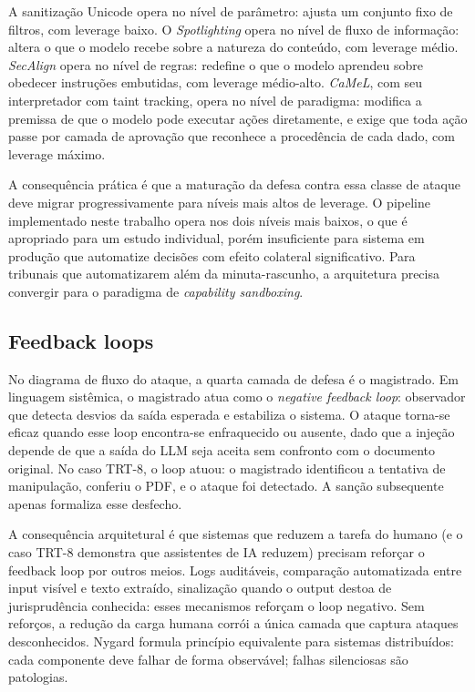 \documentclass[11pt,a4paper]{article}
\begin{document}
A sanitização Unicode opera no nível de parâmetro: ajusta um conjunto fixo de filtros, com leverage baixo. O \emph{Spotlighting} opera no nível de fluxo de informação: altera o que o modelo recebe sobre a natureza do conteúdo, com leverage médio. \emph{SecAlign} opera no nível de regras: redefine o que o modelo aprendeu sobre obedecer instruções embutidas, com leverage médio-alto. \emph{CaMeL}, com seu interpretador com taint tracking, opera no nível de paradigma: modifica a premissa de que o modelo pode executar ações diretamente, e exige que toda ação passe por camada de aprovação que reconhece a procedência de cada dado, com leverage máximo.

A consequência prática é que a maturação da defesa contra essa classe de ataque deve migrar progressivamente para níveis mais altos de leverage. O pipeline implementado neste trabalho opera nos dois níveis mais baixos, o que é apropriado para um estudo individual, porém insuficiente para sistema em produção que automatize decisões com efeito colateral significativo. Para tribunais que automatizarem além da minuta-rascunho, a arquitetura precisa convergir para o paradigma de \emph{capability sandboxing}.

\subsection{Feedback loops}

No diagrama de fluxo do ataque, a quarta camada de defesa é o magistrado. Em linguagem sistêmica, o magistrado atua como o \emph{negative feedback loop}: observador que detecta desvios da saída esperada e estabiliza o sistema. O ataque torna-se eficaz quando esse loop encontra-se enfraquecido ou ausente, dado que a injeção depende de que a saída do LLM seja aceita sem confronto com o documento original. No caso TRT-8, o loop atuou: o magistrado identificou a tentativa de manipulação, conferiu o PDF, e o ataque foi detectado. A sanção subsequente apenas formaliza esse desfecho.

A consequência arquitetural é que sistemas que reduzem a tarefa do humano (e o caso TRT-8 demonstra que assistentes de IA reduzem) precisam reforçar o feedback loop por outros meios. Logs auditáveis, comparação automatizada entre input visível e texto extraído, sinalização quando o output destoa de jurisprudência conhecida: esses mecanismos reforçam o loop negativo. Sem reforços, a redução da carga humana corrói a única camada que captura ataques desconhecidos. Nygard \cite{nygard2018} formula princípio equivalente para sistemas distribuídos: cada componente deve falhar de forma observável; falhas silenciosas são patologias.
\end{document}
